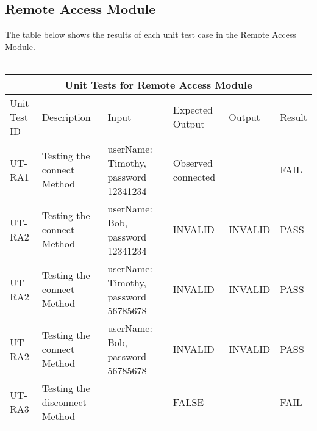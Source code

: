\documentclass[12pt, titlepage]{article}
\begin{document}
 \pagebreak
 \subsection{Remote Access Module}
 The table below shows the results of each unit test case in the Remote Access Module.\\
\\
 \begin{tabular}{ |p{1.4cm}||p{2cm}|p{2.5cm}|p{3cm}|p{3cm}|p{1.5cm}|}
   \hline
   \multicolumn{6}{|c|}{Unit Tests for Remote Access Module} \\
   \hline
   Unit Test ID & Description & Input & Expected Output & Output & Result\\
   \hline
   UT-RA1   & Testing the connect Method  & userName: Timothy, password 12341234 & Observed connected & & FAIL \\
   \hline
   UT-RA2   & Testing the connect Method &  userName: Bob, password 12341234 & INVALID & INVALID  & PASS \\
   \hline
   UT-RA2   & Testing the connect Method &  userName: Timothy, password 56785678 & INVALID & INVALID  & PASS \\  
  \hline
  UT-RA2   & Testing the connect Method &  userName: Bob, password 56785678 & INVALID & INVALID  & PASS \\ 
   \hline
  UT-RA3   & Testing the disconnect Method &   & FALSE &   & FAIL \\ 
  \hline
  \end{tabular}

  \pagebreak
\end{document}
